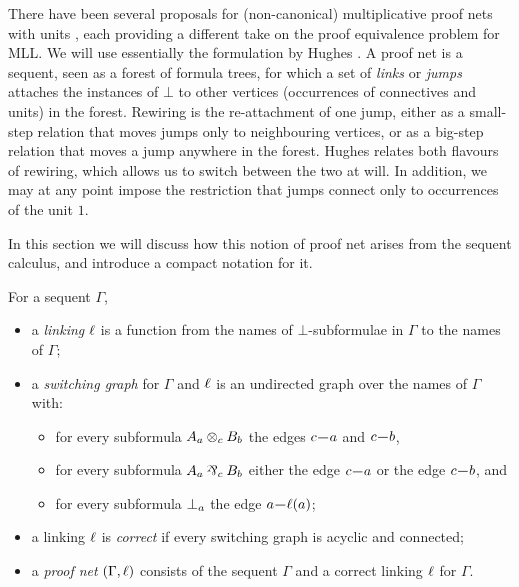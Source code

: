 \documentclass{lmcs}
\let\capsabbrev=\uppercase
\begin{document}
There have been several proposals for (non-canonical) multiplicative proof nets with units \cite{Blute-Cockett-Seely-Trimble-1996, Koh-Ong-1999, Lamarche-Strassburger-2006, Hughes-2012-nets}, each providing a different take on the proof equivalence problem for \capsabbrev{mll}.
We will use essentially the formulation by Hughes \cite{Hughes-2012-nets}. A proof net is a sequent, seen as a forest of formula trees, for which a set of \emph{links} or \emph{jumps} attaches the instances of $\bot$ to other vertices (occurrences of connectives and units) in the forest.
%
Rewiring is the re-attachment of one jump, either as a small-step relation that moves jumps only to neighbouring vertices, or as a big-step relation that moves a jump anywhere in the forest. Hughes relates both flavours of rewiring, which allows us to switch between the two at will. In addition, we may at any point impose the restriction that jumps connect only to occurrences of the unit $1$.


In this section we will discuss how this notion of proof net arises from the sequent calculus, and introduce a compact notation for it.

\begin{definition}
\label{def:proof nets}
%
For a sequent $\Gamma$,
\begin{itemize}

	\item
	a \emph{linking} $\links$ is a function from the names of $\bot$-subformulae in $\Gamma$ to the names of $\Gamma$;

	\item
	a \emph{switching graph} for $\Gamma$ and $\links$ is an undirected graph over the names of $\Gamma$ with:
	\begin{itemize}
		\item for every subformula $\named aA\named c\tn\named bB$ the edges $\edge ca$ and $\edge cb$,
		\item for every subformula $\named aA\named c\pr\named bB$ either the edge $\edge ca$ or the edge $\edge cb$, and
		\item for every subformula $\named a\bot$ the edge $\edge a{\links(a)}$;
	\end{itemize}
	
	\item
	a linking $\links$ is \emph{correct} if every switching graph is acyclic and connected;

 	\item
	a \emph{proof net} $(\Gamma,\links)$ consists of the sequent $\Gamma$ and a correct linking $\links$ for $\Gamma$.

\end{itemize}
\end{definition}
\end{document}
